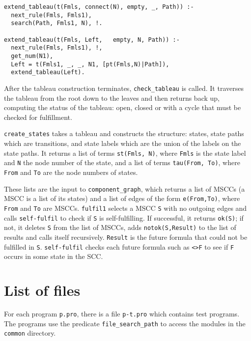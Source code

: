\documentclass[11pt]{article}
\newcommand*{\p}[1]{\textup{\texttt{#1}}}
\begin{document}
\begin{verbatim}
extend_tableau(t(Fmls, connect(N), empty, _, Path)) :-
  next_rule(Fmls, Fmls1),
  search(Path, Fmls1, N), !.

extend_tableau(t(Fmls, Left,   empty, N, Path)) :-
  next_rule(Fmls, Fmls1), !,
  get_num(N1),
  Left = t(Fmls1, _, _, N1, [pt(Fmls,N)|Path]),
  extend_tableau(Left).
\end{verbatim}

After the tableau construction terminates, \p{check\_tableau} is called.
It traverses the tableau from the root down to the leaves and then
returns back up, computing the status of the tableau: open, closed or
with a cycle that must be checked for fulfillment.

\p{create\_states} takes a tableau and constructs the structure: states,
state paths which are transitions, and state labels which are the union
of the labels on the state paths. It returns a list of terms
\p{st(Fmls,~N)}, where \p{Fmls} is the state label and \p{N} the node
number of the state, and a list of terms \p{tau(From,~To)}, where
\p{From} and \p{To} are the node numbers of states.

These lists are the input to \p{component\_graph}, which returns a list
of MSCCs (a MSCC is a list of its states) and a list of edges of the
form \p{e(From,To)}, where \p{From} and \p{To} are MSCCs. \p{fulfil1}
selects a MSCC \p{S} with no outgoing edges and calls \p{self-fulfil} to
check if \p{S} is self-fulfilling. If successful, it returns \p{ok(S)};
if not, it deletes \p{S} from the list of MSCCs, adds
\p{notok(S,Result)} to the list of results and calls itself recursively.
\p{Result} is the future formula that could not be fulfilled in \p{S}.
\p{self-fulfil} checks each future formula such as \p{<>F} to see if
\p{F} occurs in some state in the SCC.


\appendix
\section{List of files}\label{s.list}

For each program \p{p.pro}, there is a file \p{p-t.pro} which contains
test programs. The programs use the predicate \p{file\_search\_path} to
access the modules in the \p{common} directory.

\smallskip
\end{document}
